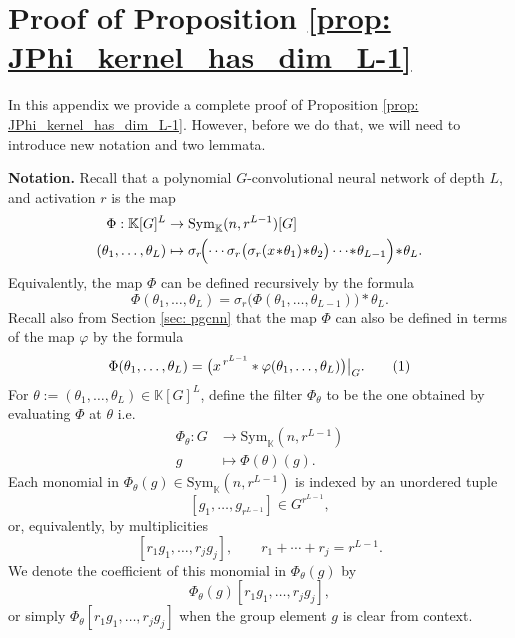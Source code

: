 \documentclass[final]{article}
\newcommand\numberthis{\addtocounter{equation}{1}\tag{\theequation}}
\newcommand{\K}{\mathbb{K}}
\newcommand{\Sym}{\text{Sym}}
\newcommand{\conv}{\ast}
\theoremstyle{definition}
\theoremstyle{plain}
\begin{document}
\section{Proof of Proposition \ref{prop: JPhi_kernel_has_dim_L-1}}\label{appendix: Phi_is_regular}

In this appendix we provide a complete proof of Proposition \ref{prop: JPhi_kernel_has_dim_L-1}. However, before we do that, we will need to introduce new notation and two lemmata.

\textbf{Notation.}
 Recall that a polynomial $G$-convolutional neural network of depth $L$, and activation $r$ is the map
    \begin{align*}
        \Phi : \K[G]^L &\to \Sym_\K(n, r^{L-1})[G]\\
        (\theta_1, \hdots, \theta_L) &\mapsto \sigma_r\!\Bigl(
        \cdots 
        \sigma_r\bigl(
           \sigma_r(x \!\conv\! \theta_1)\! \conv\! \theta_2
        \bigr)
        \cdots
        \!\conv\! \theta_{L-1}
     \Bigr)
     \!\conv\! \theta_L.
    \end{align*}
    Equivalently, the map $\Phi$ can be defined recursively by the formula
\[
\Phi(\theta_1, \hdots, \theta_L)
  = \sigma_r\bigl(\Phi(\theta_1,\dots,\theta_{L-1})\bigr)
    \conv \theta_L .
\]
Recall also from Section \ref{sec: pgcnn} that the map $\Phi$ can also be defined in terms of the map $\varphi$ by the formula
\[
\Phi(\theta_1, \dots, \theta_L) = \bigl(x^{\,r^{L-1}} \conv \varphi(\theta_1, \dots, \theta_L)\bigr)\big|_{G}.
\numberthis\label{eq:relation_Phi_varphi}
\]
For $\theta := (\theta_1, \hdots, \theta_L) \in \K[G]^L $, define the filter $\Phi_\theta$ to be the one obtained by evaluating $\Phi$ at $\theta$ i.e.
\begin{align*}
    \Phi_\theta: G &\to \Sym_\K(n, r^{L-1})\\
    g &\mapsto \Phi(\theta)(g).
\end{align*}
 Each monomial in  $\Phi_\theta(g) \in \Sym_\K(n, r^{L-1})$ is indexed by an unordered tuple
\[
[g_1,\dots,g_{r^{L-1}}]\in G^{r^{L-1}},
\]
or, equivalently, by multiplicities
\[
[r_1 g_1,\dots,r_j g_j],
\qquad
r_1+\cdots+r_j = r^{L-1}.
\]
We denote the coefficient of this monomial in \(\Phi_\theta(g)\) by
\[
\Phi_\theta(g)[r_1 g_1,\dots,r_j g_j],
\]
or simply \(\Phi_\theta[r_1 g_1,\dots,r_j g_j]\) when the group element \(g\) is clear from context.
\end{document}
